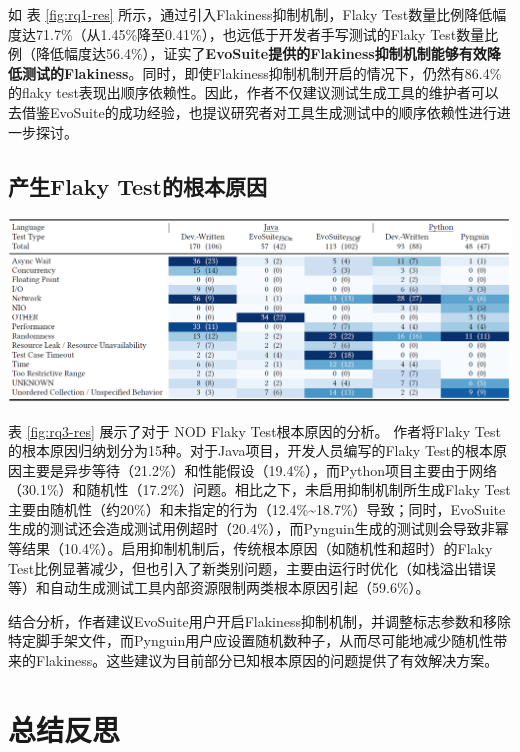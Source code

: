 \documentclass{article}
\newcommand{\flakyTest}{Flaky Test}
\begin{document}
如 表 \ref{fig:rq1-res} 所示，通过引入Flakiness抑制机制，\flakyTest 数量比例降低幅度达71.7\%（从1.45\%降至0.41\%），也远低于开发者手写测试的\flakyTest 数量比例（降低幅度达56.4\%），证实了\textbf{EvoSuite提供的Flakiness抑制机制能够有效降低测试的Flakiness}。同时，即使Flakiness抑制机制开启的情况下，仍然有86.4\%的flaky test表现出顺序依赖性。因此，作者不仅建议测试生成工具的维护者可以去借鉴EvoSuite的成功经验，也提议研究者对工具生成测试中的顺序依赖性进行进一步探讨。

\subsection{产生\flakyTest 的根本原因}
    
\begin{table}[H]
\centering
\includegraphics[width=\textwidth]{img/RQ3_res.png}
\caption{对于 NOD \flakyTest 根本原因的分析}
\label{fig:rq3-res}
\end{table}

表 \ref{fig:rq3-res} 展示了对于 NOD \flakyTest 根本原因的分析。
作者将\flakyTest 的根本原因归纳划分为15种。对于Java项目，开发人员编写的\flakyTest 的根本原因主要是异步等待（21.2\%）和性能假设（19.4\%），而Python项目主要由于网络（30.1\%）和随机性（17.2\%）问题。相比之下，未启用抑制机制所生成\flakyTest 主要由随机性（约20\%）和未指定的行为（12.4\%\textasciitilde18.7\%）导致；同时，EvoSuite生成的测试还会造成测试用例超时（20.4\%），而Pynguin生成的测试则会导致非幂等结果（10.4\%）。启用抑制机制后，传统根本原因（如随机性和超时）的\flakyTest 比例显著减少，但也引入了新类别问题，主要由运行时优化（如栈溢出错误等）和自动生成测试工具内部资源限制两类根本原因引起（59.6\%）。

结合分析，作者建议EvoSuite用户开启Flakiness抑制机制，并调整标志参数和移除特定脚手架文件，而Pynguin用户应设置随机数种子，从而尽可能地减少随机性带来的Flakiness。这些建议为目前部分已知根本原因的问题提供了有效解决方案。

\section{总结反思}
\end{document}
